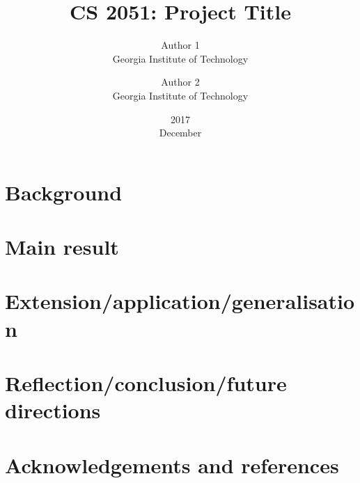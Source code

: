 \documentclass[11pt,fleqn]{article}
\title{CS 2051: Project Title}
\date{2017\\ December}
\author{Author 1 \\ Georgia Institute of Technology
\and Author 2 \\ Georgia Institute of Technology}
\theoremstyle{definition}
\begin{document}
\maketitle

\begin{abstract} \noindent

\end{abstract}

\tableofcontents

\newpage

\section{Background}



\section{Main result}



\section{Extension/application/generalisation}



\section{Reflection/conclusion/future directions}



\section{Acknowledgements and references}
\end{document}
